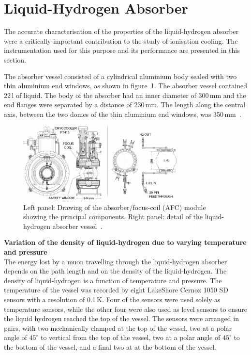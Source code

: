 \graphicspath{{07-Absorber/Figures/}}

\section{Liquid-Hydrogen Absorber}
\label{Sect:Absorber}

The accurate characterisation of the properties of the liquid-hydrogen
absorber were a critically-important contribution to the study of
ionisation cooling.
The instrumentation used for this purpose and its performance are
presented in this section.

The absorber vessel consisted of a cylindrical aluminium body sealed
with two thin aluminium end windows, as shown in
figure~\ref{Fig:AbsorberVessel:Diag}.
The absorber vessel contained 22\,l of liquid.
The body of the absorber had an inner diameter of 300\,mm and the end
flanges were separated by a distance of 230\,mm.  
The length along the central axis, between the two domes of the thin
aluminium end windows, was 350\,mm~\cite{1748-0221-13-09-T09008}. \\
\begin{figure}
  \begin{center}
    \includegraphics[width=0.75\textwidth]{AFC-drwng.pdf}
  \end{center}
  \caption{
    Left panel: Drawing of the absorber/focus-coil (AFC) module
    showing the principal components.
    Right panel: detail of the liquid-hydrogen absorber vessel~\cite{1748-0221-13-09-T09008}.
  }
  \label{Fig:AbsorberVessel:Diag}
\end{figure}


\newpage


\noindent\textbf{Variation of the density of liquid-hydrogen due to
    varying temperature and pressure} \\
\noindent
The energy lost by a muon travelling through the liquid-hydrogen
absorber depends on the path length and on
the density of the liquid-hydrogen. The density of liquid-hydrogen is
a function of temperature and pressure.  
The temperature of the vessel was recorded by eight LakeShore Cernox
1050 SD sensors with a resolution of 0.1\,K. 
Four of the sensors were used solely as temperature sensors, while the
other four were also used as level sensors to ensure the
liquid hydrogen reached the top of the vessel. 
The sensors were arranged in pairs, with two mechanically clamped at
the top of the vessel, two at a polar angle of ${45}^{\circ}$ to
vertical from the top of the vessel, two at a polar angle of
${45}^{\circ}$ to the bottom of the vessel, and a
final two at at the bottom of the vessel. 


